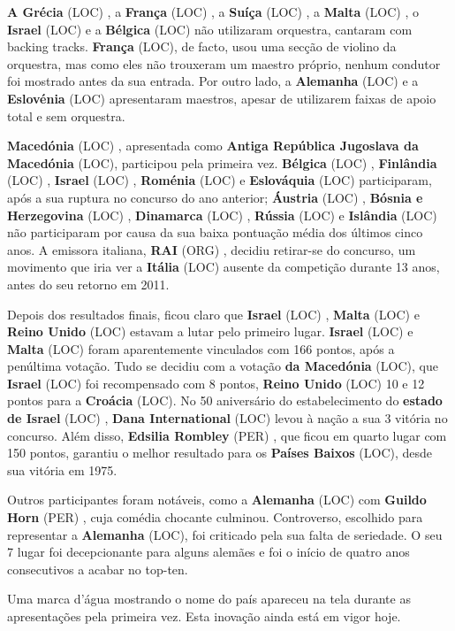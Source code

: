 \documentclass[12pt,a4paper]{article}
\begin{document}
\textbf{A Grécia} (LOC) , a \textbf{França} (LOC) , a \textbf{Suíça} (LOC) , a \textbf{Malta} (LOC) , o \textbf{Israel} (LOC) e a \textbf{Bélgica} (LOC) não utilizaram orquestra, cantaram com backing tracks. \textbf{França} (LOC), de facto, usou uma secção de violino da orquestra, mas como eles não trouxeram um maestro próprio, nenhum condutor foi mostrado antes da sua entrada. Por outro lado, a \textbf{Alemanha} (LOC) e a \textbf{Eslovénia} (LOC) apresentaram maestros, apesar de utilizarem faixas de apoio total e sem orquestra.

\textbf{Macedónia} (LOC) , apresentada como \textbf{Antiga República Jugoslava da Macedónia} (LOC), participou pela primeira vez. \textbf{Bélgica} (LOC) , \textbf{Finlândia} (LOC) , \textbf{Israel} (LOC) , \textbf{Roménia} (LOC) e \textbf{Eslováquia} (LOC) participaram, após a sua ruptura no concurso do ano anterior; \textbf{Áustria} (LOC) , \textbf{Bósnia e Herzegovina} (LOC) , \textbf{Dinamarca} (LOC) , \textbf{Rússia} (LOC) e \textbf{Islândia} (LOC) não participaram por causa da sua baixa pontuação média dos últimos cinco anos. A emissora italiana, \textbf{RAI} (ORG) , decidiu retirar-se do concurso, um movimento que iria ver a \textbf{Itália} (LOC) ausente da competição durante 13 anos, antes do seu retorno em 2011.

Depois dos resultados finais, ficou claro que \textbf{Israel} (LOC) , \textbf{Malta} (LOC) e \textbf{Reino Unido} (LOC) estavam a lutar pelo primeiro lugar. \textbf{Israel} (LOC) e \textbf{Malta} (LOC) foram aparentemente vinculados com 166 pontos, após a penúltima votação. Tudo se decidiu com a votação \textbf{da Macedónia} (LOC), que \textbf{Israel} (LOC) foi recompensado com 8 pontos, \textbf{Reino Unido} (LOC) 10 e 12 pontos para a \textbf{Croácia} (LOC). No 50  aniversário do estabelecimento do \textbf{estado de Israel} (LOC) , \textbf{Dana International} (LOC) levou à nação a sua 3 vitória no concurso. Além disso, \textbf{Edsilia Rombley} (PER) , que ficou em quarto lugar com 150 pontos, garantiu o melhor resultado para os \textbf{Países Baixos} (LOC), desde sua vitória em 1975.

Outros participantes foram notáveis, como a \textbf{Alemanha} (LOC) com \textbf{Guildo Horn} (PER) , cuja comédia chocante culminou. Controverso, escolhido para representar a \textbf{Alemanha} (LOC), foi criticado pela sua falta de seriedade. O seu 7 lugar foi decepcionante para alguns alemães e foi o início de quatro anos consecutivos a acabar no top-ten.

Uma marca d'água mostrando o nome do país apareceu na tela durante as apresentações pela primeira vez. Esta inovação ainda está em vigor hoje.
\end{document}
